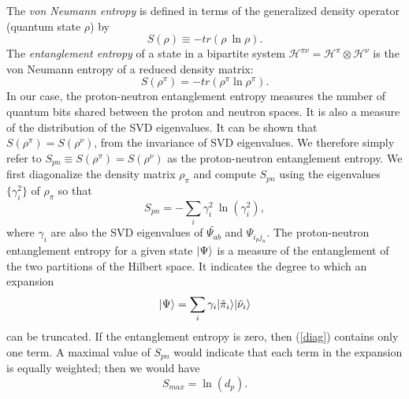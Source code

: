 The \textit{von Neumann entropy} is defined in terms 
of the generalized density operator (quantum state $\rho$) by
\begin{equation}
    S(\rho) \equiv -tr(\rho\ \ln\rho).
\end{equation}
The \textit{entanglement entropy} of a state in a bipartite system 
$\mathcal{H}^{\pi\nu} = \mathcal{H}^\pi \otimes \mathcal{H}^\nu$ is the
von Neumann entropy of a reduced density matrix: 
\begin{equation}
    S(\rho^\pi) = -tr(\rho^\pi \ln \rho^\pi).
\end{equation}
In our case, the proton-neutron entanglement entropy
measures the number of quantum bits shared between the proton and neutron spaces.
It is also a measure of the distribution of the SVD eigenvalues. It can be shown 
that $S(\rho^\pi)=S(\rho^\nu)$, from the invariance of SVD eigenvalues.
We therefore simply refer to $S_{pn}\equiv S(\rho^\pi)=S(\rho^\nu)$ as the 
proton-neutron entanglement entropy.
We first diagonalize the density matrix $\rho_\pi$ and compute 
$S_{pn}$ using the eigenvalues $\{\gamma_i^2\}$ of $\rho_\pi$ so that
\begin{equation}
    S_{pn} = -\sum_i \gamma_i^2\ \ln(\gamma_i^2),
\end{equation}
where $\gamma_i$ are also the SVD eigenvalues of $\tilde{\Psi_{ab}}$ and
$\Psi_{i_pj_n}$.
The proton-neutron entanglement entropy for a given state $|\Psi\rangle$ 
is a measure of the entanglement of the two partitions of the Hilbert space. 
It indicates the degree to which an expansion 
\begin{equation}\label{diag}
    |\Psi\rangle = \sum_i \gamma_i |\tilde{\pi}_i\rangle|\tilde{\nu}_i\rangle
\end{equation}
can be truncated. 
If the entanglement entropy is zero, then (\ref{diag})
contains only one term. A maximal value of $S_{pn}$ would indicate that each 
term in the expansion is equally weighted; then we would have
\begin{equation}
    S_{max} = \ln(d_p).
\end{equation}


